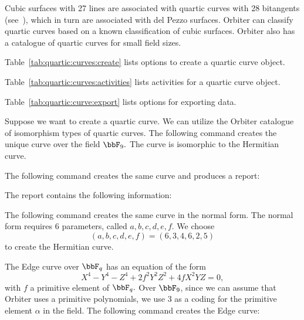 
Cubic surfaces with 27 lines are associated with 
quartic curves with 28 bitangents (see~\cite{Hirschfeld82}), 
which in turn are associated with del Pezzo surfaces. 
Orbiter can classify quartic curves based on a known classification of cubic surfaces.
Orbiter also has a catalogue of quartic curves for small field sizes.

\bigskip


Table~\ref{tab:quartic:curves:create} 
lists options to create a quartic curve object.


\bigskip
Table~\ref{tab:quartic:curves:activities} 
lists activities for a quartic curve object.


Table~\ref{tab:quartic:curve:export} 
lists options for exporting data.




\bigskip


Suppose we want to create a quartic curve. 
We can utilize the Orbiter catalogue 
of isomorphism types of quartic curves.
The following command creates the unique curve over the field $\bbF_9.$ 
The curve is isomorphic to the Hermitian curve.



\bigskip


The following command creates the same curve and produces a report:


\bigskip

The report contains the following information:

\bigskip


\bigskip


The following command creates the same curve in the normal form. The normal form requires 6 parameters, 
called $a,b,c,d,e,f.$ We choose 
$$
(a,b,c,d,e,f) = (6,3,4,6,2,5)
$$
to create the Hermitian curve.


\bigskip



\bigskip


The Edge curve over $\bbF_q$ has an equation of the form 
$$
X^4-Y^4-Z^4+2f^2Y^2Z^2+4fX^2YZ = 0,
$$
with $f$ a primitive element of $\bbF_q.$
Over $\bbF_9$, since we can assume that Orbiter uses a primitive polynomials, 
we use 3 as a coding 
for the primitive element $\alpha$ in the field. 
The following command creates the Edge curve:

